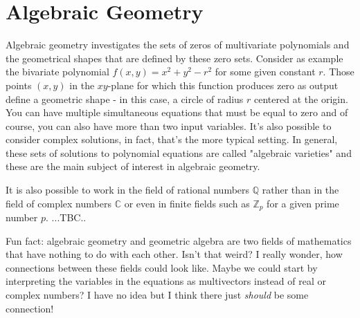 \section{Algebraic Geometry}
Algebraic geometry investigates the sets of zeros of multivariate polynomials and the geometrical shapes that are defined by these zero sets. Consider as example the bivariate polynomial $f(x,y) = x^2 + y^2 - r^2$ for some given constant $r$. Those points $(x,y)$ in the $xy$-plane for which this function produces zero as output define a geometric shape - in this case, a circle of radius $r$ centered at the origin. You can have multiple simultaneous equations that must be equal to zero and of course, you can also have more than two input variables. It's also possible to consider complex solutions, in fact, that's the more typical setting. In general, these sets of solutions to polynomial equations are called "algebraic varieties" and these are the main subject of interest in algebraic geometry.

\medskip
It is also possible to work in the field of rational numbers $\mathbb{Q}$ rather than in the field of complex numbers $\mathbb{C}$ or even in finite fields such as $\mathbb{Z}_p$ for a given prime number $p$. ...TBC..

\medskip
Fun fact: algebraic geometry and geometric algebra are two fields of mathematics that have nothing to do with each other. Isn't that weird? I really wonder, how connections between these fields could look like. Maybe we could start by interpreting the variables in the equations as multivectors instead of real or complex numbers? I have no idea but I think there just \emph{should} be some connection!



